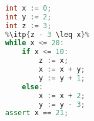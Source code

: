 \begin{lstlisting}[language=C++, language=C++, style=withAssert]  % Start your code-block
	
	int x := 0;
	int y := 2;
	int z := 3;
	%\itp{z - 3 \leq x}%
	while x <= 20:
		if x <= 10:
			z := x;
			x := x + y;
			y := y + 1;
		else:
			x := x + 2;
			y := y - 3;
	assert x == 21;
	\end{lstlisting}